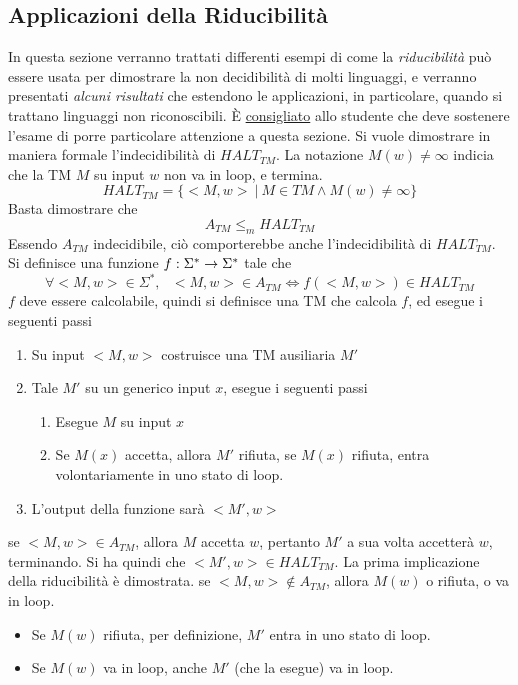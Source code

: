 \documentclass[10pt, letterpaper]{report}
\begin{document}
\subsection{Applicazioni della Riducibilità}
In questa sezione verranno trattati differenti esempi di come la \textit{riducibilità} può essere usata per dimostrare la non decidibilità di molti linguaggi, e verranno presentati \textit{alcuni risultati} che estendono le applicazioni, in particolare, quando si trattano linguaggi non riconoscibili. È \underline{consigliato} allo studente che deve sostenere l'esame di porre particolare attenzione a questa sezione.
Si vuole dimostrare in maniera formale l'indecidibilità di $HALT_{TM}$. La notazione $M(w)\ne\infty$ indicia che la TM $M$ su input $w$ non va in loop, e termina. 
$$ HALT_{TM}=\{<M,w> \ | \ M\in TM\land M(w)\ne\infty \}$$
Basta dimostrare che $$ A_{TM}\le_m HALT_{TM}$$
Essendo $A_{TM}$ indecidibile, ciò comporterebbe anche l'indecidibilità di $HALT_{TM}$. Si definisce una funzione ${f:\Sigma^*\rightarrow \Sigma^*}$ tale che 
$$ \forall <M,w>\in\Sigma^*, \ \ \ <M,w>\in A_{TM}\iff f(<M,w>)\in HALT_{TM}$$
$f$ deve essere calcolabile, quindi si definisce una TM che calcola $f$, ed esegue i seguenti passi 
\begin{enumerate}
    \item Su input $<M,w>$ costruisce una TM ausiliaria $M'$
    \item Tale $M'$ su un generico input $x$, esegue i seguenti passi\begin{enumerate}
        \item Esegue $M$ su input $x$
        \item Se $M(x)$ accetta, allora $M'$ rifiuta, se $M(x)$ rifiuta, entra volontariamente in uno stato di loop.
    \end{enumerate}
    \item L'output della funzione sarà $<M',w>$
\end{enumerate}
\boxedMath{$\implies$} se $<M,w>\in A_{TM}$, allora $M$ accetta $w$, pertanto $M'$ a sua volta accetterà $w$, terminando. Si ha quindi che $<M',w>\in HALT_{TM}$. La prima implicazione della riducibilità è dimostrata. \acc 
\boxedMath{$\impliedby$} se $<M,w>\notin A_{TM}$, allora $M(w)$ o rifiuta, o va in loop. \begin{itemize}
    \item Se $M(w)$ rifiuta, per definizione, $M'$ entra in uno stato di loop. 
    \item Se $M(w)$ va in loop, anche $M'$ (che la esegue) va in loop.
\end{itemize}
\end{document}
